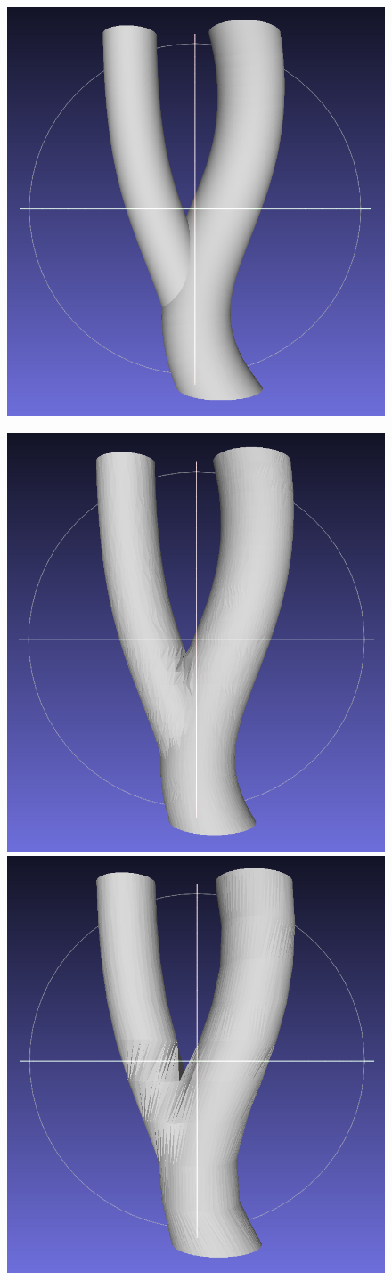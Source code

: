 \documentclass[11p, titlepage]{article}
\begin{document}
\begin{figure}[h]
     \centering
     \begin{minipage}[b]{.38\linewidth}
       {\includegraphics[width=\linewidth]{originals/simple-branch}}%
     \end{minipage}%
     \hfill
     \begin{minipage}[b]{.6\linewidth}
       {\includegraphics[width=.48\linewidth]{reconstructions/dtw-simple-branch-30}}%
       \hfill
       {\includegraphics[width=.48\linewidth]{reconstructions/dtw-simple-branch-10}}

\end{minipage}
\end{figure}
\end{document}
